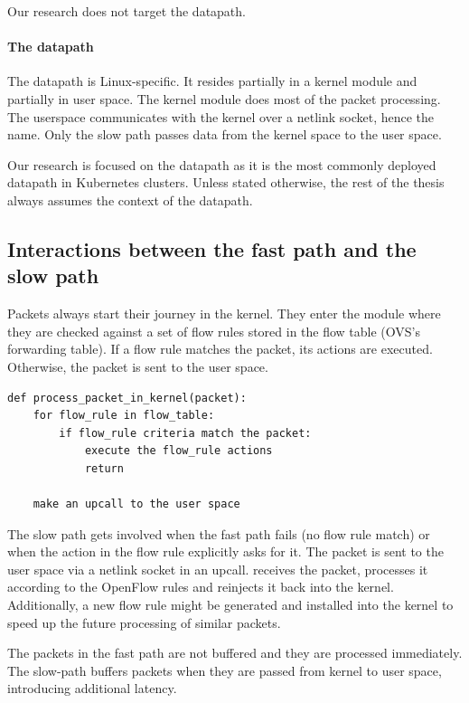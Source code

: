 Our research does not target the  datapath.

\paragraph{The  datapath}
The  datapath is Linux-specific. It resides partially in a kernel module and partially in user space. The kernel module does most of the packet processing. The userspace communicates with the kernel over a netlink socket, hence the name. Only the slow path passes data from the kernel space to the user space.

Our research is focused on the  datapath as it is the most commonly deployed datapath in Kubernetes clusters. Unless stated otherwise, the rest of the thesis always assumes the context of the  datapath.

\subsection{Interactions between the fast path and the slow path}

Packets always start their journey in the kernel. They enter the  module where they are checked against a set of flow rules stored in the flow table (OVS's forwarding table). If a flow rule matches the packet, its actions are executed. Otherwise, the packet is sent to the user space.

\begin{verbatim}
def process_packet_in_kernel(packet):
    for flow_rule in flow_table:
        if flow_rule criteria match the packet:
            execute the flow_rule actions
            return
    
    make an upcall to the user space
\end{verbatim}

The slow path gets involved when the fast path fails (no flow rule match) or when the action in the flow rule explicitly asks for it. The packet is sent to the user space via a netlink socket in an upcall.  receives the packet, processes it according to the OpenFlow rules and reinjects it back into the kernel. Additionally, a new flow rule might be generated and installed into the kernel to speed up the future processing of similar packets.

The packets in the fast path are not buffered and they are processed immediately. The slow-path buffers packets when they are passed from kernel to user space, introducing additional latency.

